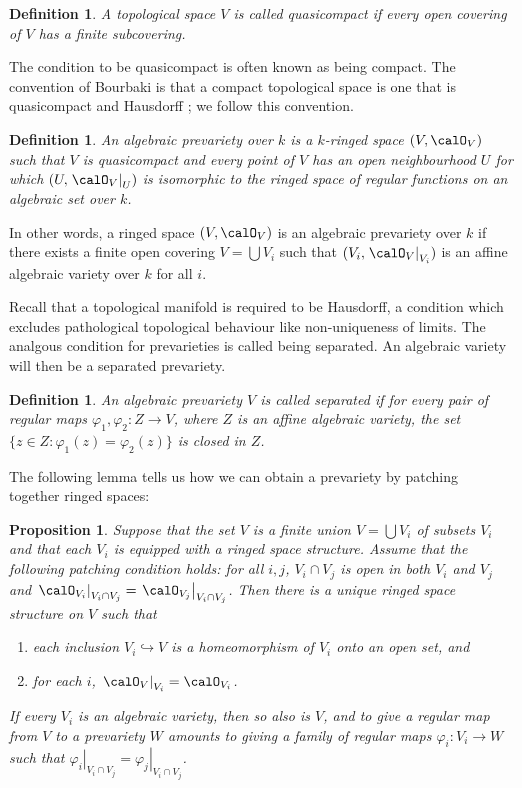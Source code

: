 \documentclass[12pt]{amsart}
\theoremstyle{plain}
\newtheorem{definition}[theorem]{Definition}
\newtheorem{proposition}[theorem]{Proposition}
\begin{document}
\begin{definition}
A topological space $V$ is called quasicompact if every open covering of $V$ has a finite subcovering.
\end{definition}

The condition to be quasicompact is often known as being compact.
The convention of Bourbaki is that a compact topological space is one that is quasicompact and Hausdorff \cite[\S 2 g.]{Milne13}; we follow this convention.

\begin{definition}
An algebraic prevariety over $k$ is a $k$-ringed space $(V, \calO_V)$ such that $V$ is quasicompact and every point of $V$ has an open neighbourhood $U$ for which $(U, \left. \calO_V \right|_U)$ is isomorphic to the ringed space of regular functions on an algebraic set over $k$.
\end{definition}

In other words, a ringed space $(V, \calO_V)$ is an algebraic prevariety over $k$ if there exists a finite open covering $V = \bigcup V_i$ such that $(V_i, \left. \calO_V \right|_{V_i})$ is an affine algebraic variety over $k$ for all $i$.

Recall that a topological manifold is required to be Hausdorff, a condition which excludes pathological topological behaviour like non-uniqueness of limits.
The analgous condition for prevarieties is called being separated.
An algebraic variety will then be a separated prevariety.

\begin{definition}
An algebraic prevariety $V$ is called separated if for every pair of regular maps $\varphi_1, \varphi_2 : Z \to V$, where $Z$ is an affine algebraic variety, the set $\{z \in Z : \varphi_1(z) = \varphi_2(z)\}$ is closed in $Z$.
\end{definition}

The following lemma tells us how we can obtain a prevariety by patching together ringed spaces:

\begin{proposition}
Suppose that the set $V$ is a finite union $V = \bigcup V_i$  of subsets $V_i$ and that each $V_i$ is equipped with a ringed space structure.
Assume that the following patching condition holds: for all $i,j$, $V_i \cap V_j$ is open in both $V_i$ and $V_j$ and $\left. \calO_{V_i} \right|_{V_i \cap V_j} = \left. \calO_{V_j} \right|_{V_i \cap V_j}$.
Then there is a unique ringed space structure on $V$ such that
\begin{enumerate}
\item
each inclusion $V_i \hookrightarrow V$ is a homeomorphism of $V_i$ onto an open set, and

\item
for each $i$, $\left. \calO_V \right|_{V_i} = \calO_{V_i}$.
\end{enumerate}
If every $V_i$ is an algebraic variety, then so also is $V$, and to give a regular map from $V$ to a prevariety $W$ amounts to giving a family of regular maps $\varphi_i : V_i \to W$ such that $\left. \varphi_i \right|_{V_i \cap V_j} = \left. \varphi_j \right|_{V_i \cap V_j}$.
\end{proposition}
\end{document}
